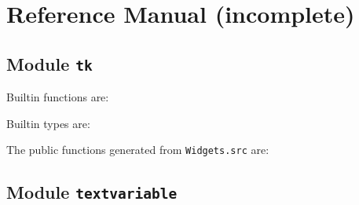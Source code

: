 \chapter{Reference Manual (incomplete)}
\label{chap:ref}
\section*{Module {\tt tk}}

Builtin functions are:
\begin{alltt}

\end{alltt}

Builtin types are:


\noindent
The public functions generated from {\tt Widgets.src} are:
\begin{alltt}

\end{alltt}



\section*{Module {\tt textvariable}}

\begin{alltt}

\end{alltt}
